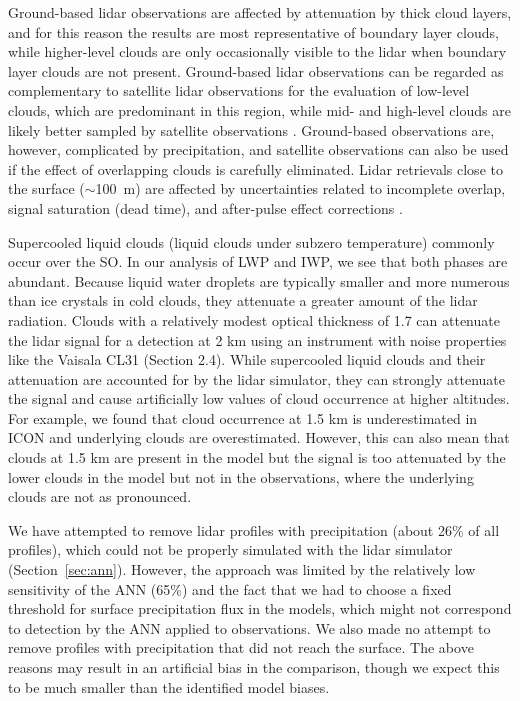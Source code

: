 \documentclass[draft]{agujournal2019}
\begin{document}
Ground-based lidar observations are affected by attenuation by thick cloud layers, and for this reason the results are most representative of boundary layer clouds, while higher-level clouds are only occasionally visible to the lidar when boundary layer clouds are not present. Ground-based lidar observations can be regarded as complementary to satellite lidar observations for the evaluation of low-level clouds, which are predominant in this region, while mid- and high-level clouds are likely better sampled by satellite observations \cite{mcerlich2021}. Ground-based observations are, however, complicated by precipitation, and satellite observations can also be used if the effect of overlapping clouds is carefully eliminated. Lidar retrievals close to the surface ($\sim$100~m) are affected by uncertainties related to incomplete overlap, signal saturation (dead time), and after-pulse effect corrections \cite{kuma2021}.

Supercooled liquid clouds (liquid clouds under subzero temperature) commonly occur over the SO. In our analysis of LWP and IWP, we see that both phases are abundant. Because liquid water droplets are typically smaller and more numerous than ice crystals in cold clouds, they attenuate a greater amount of the lidar radiation. Clouds with a relatively modest optical thickness of 1.7 can attenuate the lidar signal for a detection at 2 km using an instrument with noise properties like the Vaisala CL31 (Section 2.4). While supercooled liquid clouds and their attenuation are accounted for by the lidar simulator, they can strongly attenuate the signal and cause artificially low values of cloud occurrence at higher altitudes. For example, we found that cloud occurrence at 1.5 km is underestimated in ICON and underlying clouds are overestimated. However, this can also mean that clouds at 1.5 km are present in the model but the signal is too attenuated by the lower clouds in the model but not in the observations, where the underlying clouds are not as pronounced.

We have attempted to remove lidar profiles with precipitation (about 26\% of all profiles), which could not be properly simulated with the lidar simulator (Section~\ref{sec:ann}). However, the approach was limited by the relatively low sensitivity of the ANN (65\%) and the fact that we had to choose a fixed threshold for surface precipitation flux in the models, which might not correspond to detection by the ANN applied to observations. We also made no attempt to remove profiles with precipitation that did not reach the surface. The above reasons may result in an artificial bias in the comparison, though we expect this to be much smaller than the identified model biases.
\end{document}
